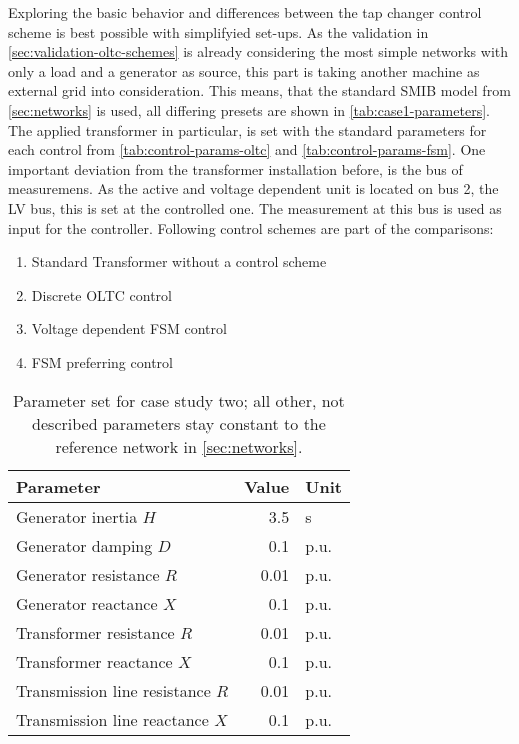Exploring the basic behavior and differences between the tap changer control scheme is best possible with simplifyied set-ups.
As the validation in \autoref{sec:validation-oltc-schemes} is already considering the most simple networks with only a load and a generator as source, this part is taking another machine as external grid into consideration.
This means, that the standard \acs{SMIB} model from \autoref{sec:networks} is used, all differing presets are shown in \autoref{tab:case1-parameters}.
The applied transformer in particular, is set with the standard parameters for each control from \autoref{tab:control-params-oltc} and \autoref{tab:control-params-fsm}.
One important deviation from the transformer installation before, is the bus of measuremens.
As the active and voltage dependent unit is located on bus 2, the \acs{LV} bus, this is set at the controlled one.
The measurement at this bus is used as input for the controller.
Following control schemes are part of the comparisons:
\newpage
\begin{enumerate}
    \item Standard Transformer without a control scheme
    \item Discrete \acs{OLTC} control
    \item Voltage dependent \acs{FSM} control
    \item \acs{FSM} preferring control
\end{enumerate} 

\begin{table}[htbp!]
    \caption[Parameter set for case study two]{Parameter set for case study two; all other, not described parameters stay constant to the reference network in \autoref{sec:networks}.}
    \label{tab:case1-parameters}
    \vspace*{12pt}
    \centering
    \small
    \begin{tabularx}{\textwidth}{Xrl}
        \textbf{Parameter} & \textbf{Value} & \textbf{Unit} \\ \hline
        \toprule
        Generator inertia $H$ & 3.5 & s \\
        Generator damping $D$ & 0.1 & p.u. \\
        Generator resistance $R$ & 0.01 & p.u. \\
        Generator reactance $X$ & 0.1 & p.u. \\
        Transformer resistance $R$ & 0.01 & p.u. \\
        Transformer reactance $X$ & 0.1 & p.u. \\
        Transmission line resistance $R$ & 0.01 & p.u. \\
        Transmission line reactance $X$ & 0.1 & p.u. \\
        \bottomrule
    \end{tabularx}
\end{table}

